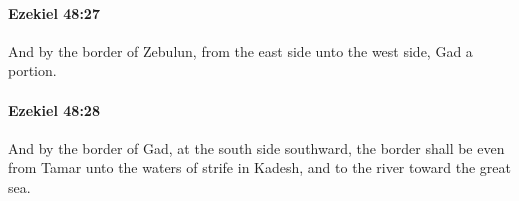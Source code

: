 		\paragraph{Ezekiel 48:27} %
			\label{EZEKIEL-48-27}

			And by the border of Zebulun, from the east side unto the west side, Gad a portion.


		\paragraph{Ezekiel 48:28} %
			\label{EZEKIEL-48-28}

			And by the border of Gad, at the south side southward, the border shall be even from Tamar unto the waters of strife in Kadesh, and to the river toward the great sea.


